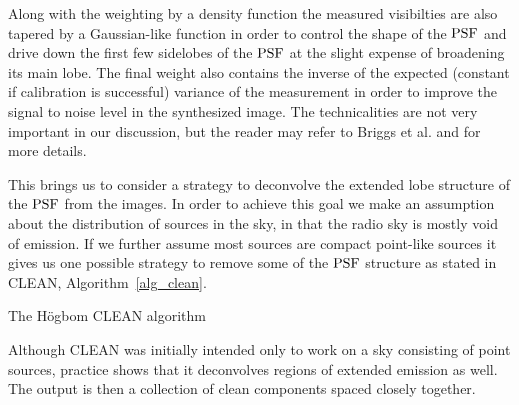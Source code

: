 Along with the weighting by a density function the measured visibilties are also tapered by a Gaussian-like function in order to control the shape of the $\textrm{PSF}$ and
drive down the first few sidelobes of the $\textrm{PSF}$ at the slight expense of broadening its main lobe. The final weight also contains the inverse of the expected 
(constant if calibration is successful) variance of the measurement in order to improve the signal to noise level in the synthesized image. The technicalities are
not very important in our discussion, but the reader may refer to Briggs et al. \cite[Lecture 7]{taylor1999synthesis} and \cite[p. 387-399]{thompson2008interferometry} for 
more details.

This brings us to consider a strategy to deconvolve the extended lobe structure of the $\textrm{PSF}$ from the images. In order to achieve this goal we make an assumption about the distribution of sources in the sky, in that the radio
sky is mostly void of emission. If we further assume most sources are compact point-like sources it gives us one possible strategy to remove some of the $\textrm{PSF}$ structure as stated in CLEAN, Algorithm~\ref{alg_clean}.
\begin{algorithm}
  \begin{algorithmic}
  \REPEAT
  \end{algorithmic}
  \caption{The H\"ogbom CLEAN algorithm}
  \label{alg_clean}
\end{algorithm}

Although CLEAN was initially intended only to work on a sky consisting of point sources, practice shows that it
deconvolves regions of extended emission as well. The output is then a collection of clean components spaced closely
together. 

